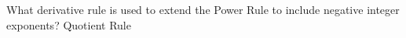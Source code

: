 {What derivative rule is used to extend the Power Rule to include negative integer exponents?
}
{Quotient Rule
}
